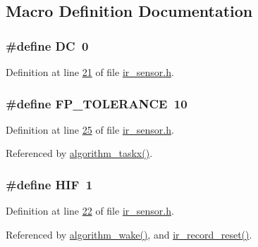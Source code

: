 \subsection{Macro Definition Documentation}
\hypertarget{a00017_a0caba21dab832e280875be65012b30fc}{
\subsubsection[{D\+C}]{\setlength{\rightskip}{0pt plus 5cm}\#define D\+C~0}}\label{a00017_a0caba21dab832e280875be65012b30fc}


Definition at line \hyperlink{a00017_source_l00021}{21} of file \hyperlink{a00017_source}{ir\+\_\+sensor.\+h}.

\hypertarget{a00017_a946f0acff4fd16a65859479e9e0b9513}{
\subsubsection[{F\+P\+\_\+\+T\+O\+L\+E\+R\+A\+N\+C\+E}]{\setlength{\rightskip}{0pt plus 5cm}\#define F\+P\+\_\+\+T\+O\+L\+E\+R\+A\+N\+C\+E~10}}\label{a00017_a946f0acff4fd16a65859479e9e0b9513}


Definition at line \hyperlink{a00017_source_l00025}{25} of file \hyperlink{a00017_source}{ir\+\_\+sensor.\+h}.



Referenced by \hyperlink{a00038_source_l01905}{algorithm\+\_\+taskx()}.

\hypertarget{a00017_aaa1c1ffe30eff38b979b1af9d4e4ef19}{
\subsubsection[{H\+I\+F}]{\setlength{\rightskip}{0pt plus 5cm}\#define H\+I\+F~1}}\label{a00017_aaa1c1ffe30eff38b979b1af9d4e4ef19}


Definition at line \hyperlink{a00017_source_l00022}{22} of file \hyperlink{a00017_source}{ir\+\_\+sensor.\+h}.



Referenced by \hyperlink{a00038_source_l00670}{algorithm\+\_\+wake()}, and \hyperlink{a00045_source_l01152}{ir\+\_\+record\+\_\+reset()}.

